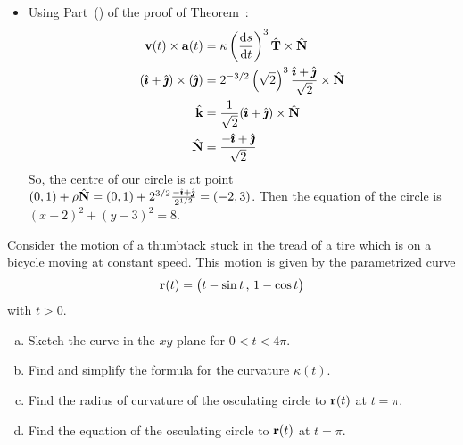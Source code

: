 \begin{solution}
\begin{itemize}
\item Using Part~() of the proof of Theorem~:
\begin{align*}
\vv(t) \times \va(t) &= \ka\left(\diff{s}{t}\right)^3\hT \times \hN\\
(\hi+\hj)\times(\hj)&=2^{-3/2}\left(\sqrt2 \right)^3\frac{\hi+\hj}{\sqrt 2}\times\hN\\
\hk &=\frac{1}{\sqrt2}(\hi + \hj)\times\hN\\
\hN&=\frac{-\hi+\hj}{\sqrt2}
 \end{align*}
So, the centre of our circle is at point $(0,1)+\rho\hat{\mathbf{N}}=(0,1)+2^{3/2}\frac{-\hat{\pmb{\imath}}+\hat{\pmb{\jmath}}}{2^{1/2}}=(-2,3)$. Then the equation of the circle is $(x+2)^2+(y-3)^2=8$.
\end{itemize}
\end{solution}


\begin{question}[M317 2011A] %
\item   %
Consider the motion of a thumbtack stuck in the tread of a tire which 
is on a bicycle moving at constant speed. This motion is given by 
the parametrized curve 
\begin{equation*}
\mathbf{r}(t) = \big(t - \sin t\,,\, 1 - \cos t\big)
\end{equation*}
with $t > 0$.
\begin{enumerate}[(a)]
\item
Sketch the curve in the $xy$-plane for $0 < t < 4\pi$.
\item
Find and simplify the formula for the curvature $\kappa(t)$.
\item
Find the radius of curvature of the osculating circle to 
$\mathbf{r}(t)$ at $t = \pi$.
\item
Find the equation of the osculating circle to $\mathbf{r}(t)$ at $t = \pi$.
\end{enumerate}
\end{question}

